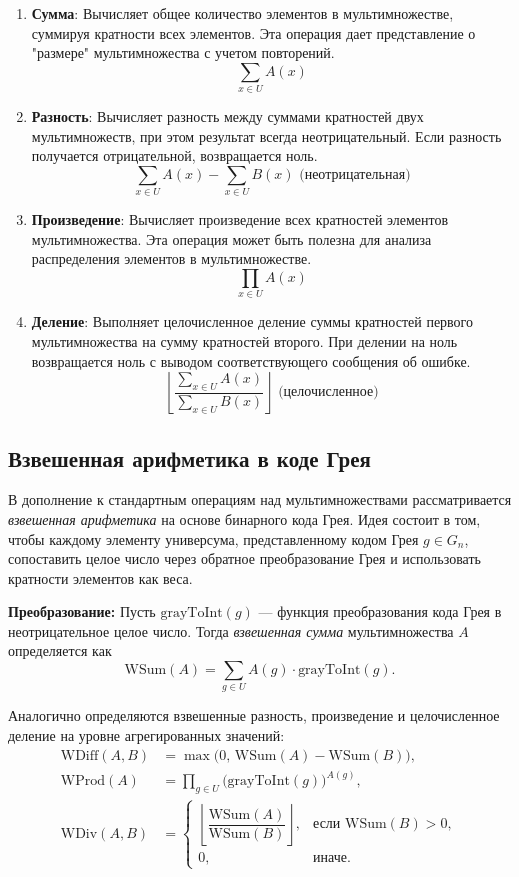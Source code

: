 \documentclass[12pt,a4paper]{article}
\begin{document}
\begin{enumerate}
    \item \textbf{Сумма}: Вычисляет общее количество элементов в мультимножестве, суммируя кратности всех элементов. Эта операция дает представление о "размере" мультимножества с учетом повторений.
    $$\sum_{x \in U} A(x)$$
    
    \item \textbf{Разность}: Вычисляет разность между суммами кратностей двух мультимножеств, при этом результат всегда неотрицательный. Если разность получается отрицательной, возвращается ноль.
    $$\sum_{x \in U} A(x) - \sum_{x \in U} B(x) \text{ (неотрицательная)}$$
    
    \item \textbf{Произведение}: Вычисляет произведение всех кратностей элементов мультимножества. Эта операция может быть полезна для анализа распределения элементов в мультимножестве.
    $$\prod_{x \in U} A(x)$$
    
    \item \textbf{Деление}: Выполняет целочисленное деление суммы кратностей первого мультимножества на сумму кратностей второго. При делении на ноль возвращается ноль с выводом соответствующего сообщения об ошибке.
    $$\left\lfloor \frac{\sum_{x \in U} A(x)}{\sum_{x \in U} B(x)} \right\rfloor \text{ (целочисленное)}$$
\end{enumerate}

\subsection{Взвешенная арифметика в коде Грея}

В дополнение к стандартным операциям над мультимножествами рассматривается \textit{взвешенная арифметика} на основе бинарного кода Грея. Идея состоит в том, чтобы каждому элементу универсума, представленному кодом Грея $g \in G_n$, сопоставить целое число через обратное преобразование Грея и использовать кратности элементов как веса.

\textbf{Преобразование:} Пусть $\text{grayToInt}(g)$ — функция преобразования кода Грея в неотрицательное целое число. Тогда \textit{взвешенная сумма} мультимножества $A$ определяется как
$$\text{WSum}(A) = \sum_{g \in U} A(g) \cdot \text{grayToInt}(g).$$

Аналогично определяются взвешенные разность, произведение и целочисленное деление на уровне агрегированных значений:
\begin{align*}
\text{WDiff}(A,B) &= \max\bigl(0,\, \text{WSum}(A) - \text{WSum}(B)\bigr),\\
\text{WProd}(A) &= \prod_{g \in U} \bigl(\text{grayToInt}(g)\bigr)^{A(g)},\\
\text{WDiv}(A,B) &= \begin{cases}
\left\lfloor \dfrac{\text{WSum}(A)}{\text{WSum}(B)} \right\rfloor, & \text{если } \text{WSum}(B) > 0,\\
0, & \text{иначе.}
\end{cases}
\end{align*}
\end{document}
